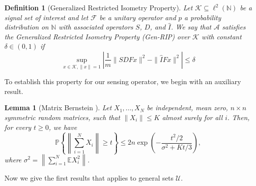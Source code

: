 \documentclass[a4paper,oneside]{amsart}
\newtheorem{definition}{Definition}[section]
\newtheorem{lemma}[theorem]{Lemma}
\newcommand{\lnn}{\ell^2(\mathbb{N})}
\begin{document}
\begin{definition}[Generalized Restricted Isometry Property]\label{def:gen-rip}
Let $\mathcal{K} \subseteq \lnn$ be a signal set of interest and let $\mathcal{F}$ be a unitary operator and $p$ a probability distribution on $\mathbb{N}$ with associated operators $S$, $D$, and $\hat{I}$. We say that $\mathcal{A}$ satisfies the Generalized Restricted Isometry Property (Gen-RIP) over $\mathcal{K}$ with constant $\delta \in (0, 1)$ if
\[
\sup _{{x} \in \mathcal{K} , \|x\|=1}\left|\frac{1}{m}\|S D F {x}\|^2-\| \hat{I} F {x}\|^2\right| \leq \delta 
\]
\end{definition}

To establish this property for our sensing operator, we begin with an auxiliary result.

\begin{lemma}[Matrix Bernstein { \cite[Theorem 5.4.1]{bern}}]\label{bern}
Let $X_1, \dots, X_N$ be independent, mean zero, $n \times n$ symmetric random matrices, such that $\|X_i\| \le K$ almost surely for all $i$. Then, for every $t \ge 0$, we have
\[
\mathbb{P} \left\{ \left\| \sum_{i=1}^N X_i \right\| \ge t \right\} \le 2n \exp \left( - \frac{t^2/2}{\sigma^2 + Kt/3} \right),
\]
\textit{where $\sigma^2 = \left\| \sum_{i=1}^N \mathbb{E} X_i^2 \right\|$.}
\end{lemma}
Now we give the first results that applies to general sets $\mathcal{U}$.
\end{document}
